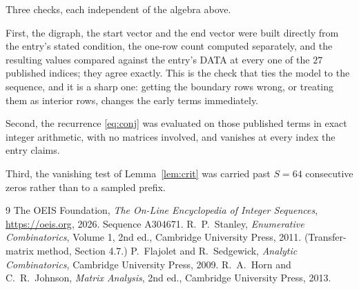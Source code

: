 \documentclass[11pt,a4paper]{article}
\theoremstyle{plain}
\theoremstyle{definition}
\begin{document}
Three checks, each independent of the algebra above.

First, the digraph, the start vector and the end vector were built directly from the
entry's stated condition, the one-row count computed separately, and the resulting values
compared against the entry's DATA at every one of the $27$ published indices; they
agree exactly. This is the check that ties the model to the sequence, and it is a sharp one:
getting the boundary rows wrong, or treating them as interior rows, changes the early terms
immediately.

Second, the recurrence \eqref{eq:conj} was evaluated on those published terms in exact
integer arithmetic, with no matrices involved, and vanishes at every index the entry claims.

Third, the vanishing test of Lemma~\ref{lem:crit} was carried past $S=64$ consecutive
zeros rather than to a sampled prefix.

\begin{thebibliography}{9}
 The OEIS Foundation, \emph{The On-Line Encyclopedia of Integer
Sequences}, \url{https://oeis.org}, 2026. Sequence A304671.
 R.~P.~Stanley, \emph{Enumerative Combinatorics}, Volume 1, 2nd ed.,
Cambridge University Press, 2011. (Transfer-matrix method, Section 4.7.)
 P.~Flajolet and R.~Sedgewick, \emph{Analytic Combinatorics}, Cambridge
University Press, 2009.
 R.~A.~Horn and C.~R.~Johnson, \emph{Matrix Analysis}, 2nd ed., Cambridge
University Press, 2013.
\end{thebibliography}
\end{document}
